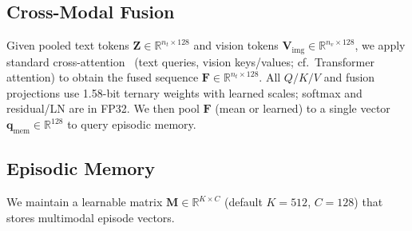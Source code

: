 

\subsection{Cross-Modal Fusion}
Given pooled text tokens $\mathbf{Z}\in\mathbb{R}^{n_t\times128}$ and vision tokens
$\mathbf{V}_{\text{img}}\in\mathbb{R}^{n_v\times128}$, we apply standard cross-attention~\citep{vaswani2017attention}
(text queries, vision keys/values; cf.\ Transformer attention) to obtain the fused
sequence $\mathbf{F}\in\mathbb{R}^{n_t\times128}$. All $Q/K/V$ and fusion projections
use 1.58-bit ternary weights with learned scales; softmax and residual/LN are in FP32.
We then pool $\mathbf{F}$ (mean or learned) to a single vector
$\mathbf{q}_{\text{mem}}\in\mathbb{R}^{128}$ to query episodic memory.


\subsection{Episodic Memory}

We maintain a learnable matrix $\mathbf{M}\in\mathbb{R}^{K\times C}$ (default $K{=}512$, $C{=}128$) that stores multimodal episode vectors.

